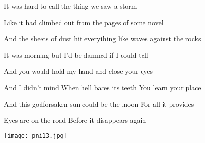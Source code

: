 \begin{strophe*}
  It was hard to call the thing we saw a storm

  Like it had climbed out from the pages of some novel

  And the sheets of dust hit everything like waves against the rocks

  It was morning but I'd be damned if I could tell

  And you would hold my hand and close your eyes

  And I didn't mind\hfill
  When hell bares its teeth \hfill
  You learn your place

  And this godforsaken sun could be the moon \hfill
  For all it provides

  Eyes are on the road \hfill
  Before it disappears again
\end{strophe*}

\vfill
\begin{center}
 \texttt{[image: pni13.jpg]}
\end{center}
\vfill